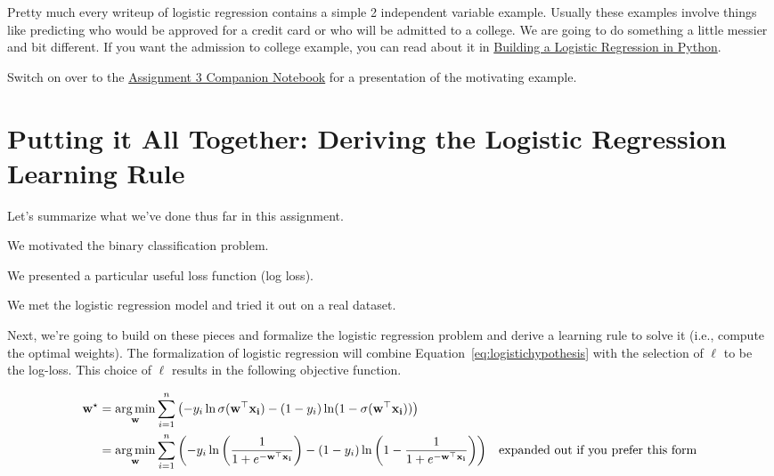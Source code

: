 \documentclass[assignment03_Solutions]{subfiles}
\begin{document}
\begin{notice}
Pretty much every writeup of logistic regression contains a simple 2 independent variable example.  Usually these examples involve things like predicting who would be approved for a credit card or who will be admitted to a college.  We are going to do something a little messier and bit different.  If you want the admission to college example, you can read about it in \href{https://towardsdatascience.com/building-a-logistic-regression-in-python-301d27367c24}{Building a Logistic Regression in Python}.
\end{notice}

\begin{externalresources}[(60 minutes)]
Switch on over to the \href{https://colab.research.google.com/github/mlfa19/assignments/blob/master/Module\%201/03/Assignment_03_Companion.ipynb}{Assignment 3 Companion Notebook} for a presentation of the motivating example.
\end{externalresources}

\section{Putting it All Together: Deriving the Logistic Regression Learning Rule}
Let's summarize what we've done thus far in this assignment.

\bi
\item We motivated the binary classification problem.
\item We presented a particular useful loss function (log loss).
\item We met the logistic regression model and tried it out on a real dataset.
\ei

Next, we're going to build on these pieces and formalize the logistic regression problem and derive a learning rule to solve it (i.e., compute the optimal weights). The formalization of logistic regression will combine Equation~\ref{eq:logistichypothesis} with the selection of $\ell$ to be the log-loss.  This choice of $\ell$ results in the following objective function.

\begin{align}
\mathbf{w}^\star &= \operatorname*{arg\,min}_{\mathbf{w}} \sum_{i=1}^n \left ( - y_i \ln \sigma(\mathbf{w}^\top \mathbf{x_i}) - (1-y_i) \ln (1 - \sigma(\mathbf{w}^\top \mathbf{x_i}) ) \right) \\
&= \operatorname*{arg\,min}_{\mathbf{w}} \sum_{i=1}^n \left (  - y_i \ln \left ( \frac{1}{1+e^{-\mathbf{w}^\top \mathbf{x_i}}} \right) - (1-y_i) \ln  \left (1 - \frac{1}{1+e^{-\mathbf{w}^\top \mathbf{x_i}}} \right ) \right) &\mbox{expanded out if you prefer this form} \label{eq:objective}
\end{align}
\end{document}

